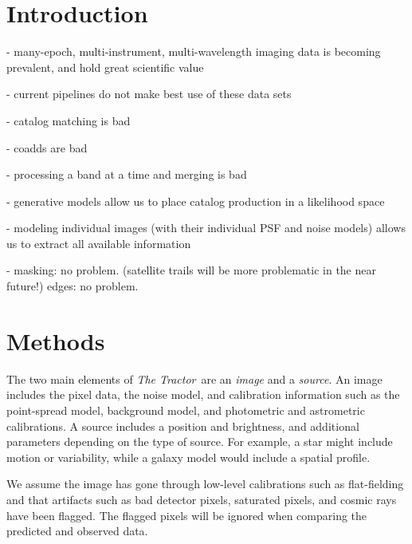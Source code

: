 \documentclass[modern, linenumbers]{aastex631}
\newcommand{\thetractor}{\emph{The Tractor}}
\begin{document}
\section{Introduction} \label{sec:intro}

- many-epoch, multi-instrument, multi-wavelength imaging data is becoming prevalent, and hold great scientific value

- current pipelines do not make best use of these data sets

- catalog matching is bad

- coadds are bad

- processing a band at a time and merging is bad

- generative models allow us to place catalog production in a likelihood space

- modeling individual images (with their individual PSF and noise models) allows us to extract all available information

- masking: no problem.  (satellite trails will be more problematic in the near future!)  edges: no problem.

\cite{2009AJ....137.4400L}

\section{Methods}


The two main elements of \thetractor\ are an \emph{image} and a
\emph{source}.  An image includes the pixel data, the noise model, and
calibration information such as the point-spread model, background
model, and photometric and astrometric calibrations.  A source
includes a position and brightness, and additional parameters
depending on the type of source.  For example, a star might include
motion or variability, while a galaxy model would include a spatial
profile.


We assume the image has gone through low-level calibrations such
as flat-fielding and that artifacts such as bad detector pixels, saturated pixels, and cosmic rays have been flagged.  The flagged pixels will be ignored when comparing the predicted and observed data.


\end{document}
